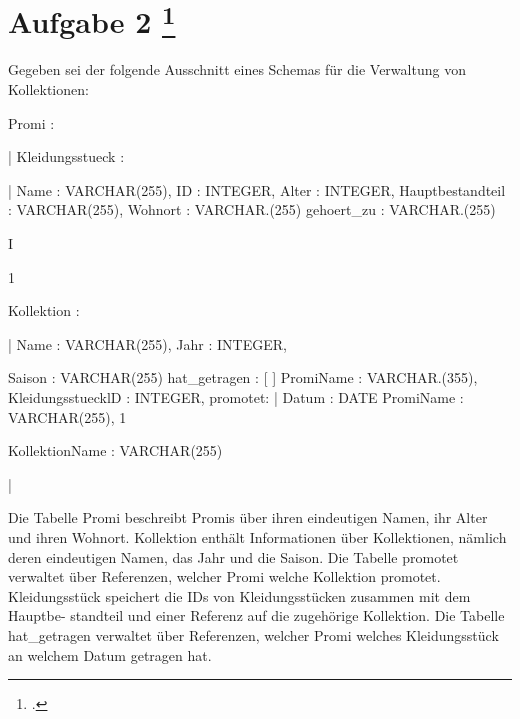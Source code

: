 \documentclass{lehramt-informatik-aufgabe}
\begin{document}
\section{Aufgabe 2
\footcite{66116:2020:03}}

Gegeben sei der folgende Ausschnitt eines Schemas für die Verwaltung von
Kollektionen:

Promi : {| Kleidungsstueck : {|
Name : VARCHAR(255), ID : INTEGER,
Alter : INTEGER, Hauptbestandteil : VARCHAR(255),
Wohnort : VARCHAR.(255) gehoert\_zu : VARCHAR.(255)

I} 1}

Kollektion : {|
Name : VARCHAR(255),
Jahr : INTEGER,

Saison : VARCHAR(255) hat\_getragen : {[
]} PromiName : VARCHAR.(355),
KleidungsstuecklD : INTEGER,
promotet: {| Datum : DATE
PromiName : VARCHAR(255), 1}

KollektionName : VARCHAR(255)

|}

Die Tabelle Promi beschreibt Promis über ihren eindeutigen Namen, ihr
Alter und ihren Wohnort. Kollektion enthält Informationen über
Kollektionen, nämlich deren eindeutigen Namen, das Jahr und die Saison.
Die Tabelle promotet verwaltet über Referenzen, welcher Promi welche
Kollektion promotet. Kleidungsstück speichert die IDs von
Kleidungsstücken zusammen mit dem Hauptbe- standteil und einer Referenz
auf die zugehörige Kollektion. Die Tabelle hat\_getragen verwaltet über
Referenzen, welcher Promi welches Kleidungsstück an welchem Datum
getragen hat.
\end{document}
